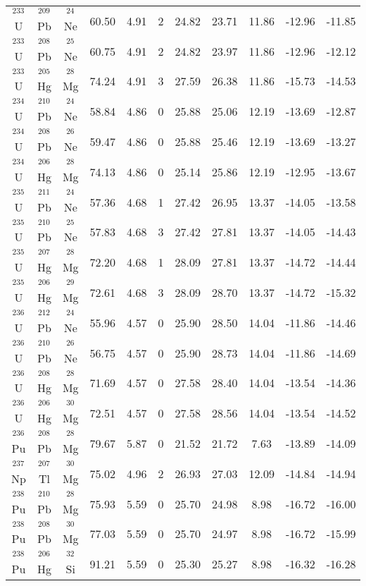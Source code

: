 \documentclass[preprint,10pt]{elsarticle}
\begin{document}
\begin{table*}[!htbp]
{\begin{tabular}{ccccccccccc}
$^{233}$U  & $^{209}$Pb & $^{24}$Ne &60.50  & 4.91& 2&24.82  & 23.71  & 11.86 &  -12.96 & -11.85 \\
$^{233}$U  & $^{208}$Pb & $^{25}$Ne &60.75  & 4.91& 2&24.82  & 23.97  & 11.86 &  -12.96 & -12.12 \\
$^{233}$U  & $^{205}$Hg & $^{28}$Mg &74.24  & 4.91& 3&27.59  & 26.38  & 11.86 &  -15.73 & -14.53 \\
$^{234}$U  & $^{210}$Pb & $^{24}$Ne &58.84  & 4.86& 0&25.88  & 25.06  & 12.19 &  -13.69 & -12.87 \\
$^{234}$U  & $^{208}$Pb & $^{26}$Ne &59.47  & 4.86& 0&25.88  & 25.46  & 12.19 &  -13.69 & -13.27 \\
$^{234}$U  & $^{206}$Hg & $^{28}$Mg &74.13  & 4.86& 0&25.14  & 25.86  & 12.19 &  -12.95 & -13.67 \\
$^{235}$U  & $^{211}$Pb & $^{24}$Ne &57.36  & 4.68& 1&27.42  & 26.95  & 13.37 &  -14.05 & -13.58 \\
$^{235}$U  & $^{210}$Pb & $^{25}$Ne &57.83  & 4.68& 3&27.42  & 27.81  & 13.37 &  -14.05 & -14.43 \\
$^{235}$U  & $^{207}$Hg & $^{28}$Mg &72.20  & 4.68& 1&28.09  & 27.81  & 13.37 &  -14.72 & -14.44 \\
$^{235}$U  & $^{206}$Hg & $^{29}$Mg &72.61  & 4.68& 3&28.09  & 28.70  & 13.37 &  -14.72 & -15.32 \\
$^{236}$U  & $^{212}$Pb & $^{24}$Ne &55.96  & 4.57& 0&25.90  & 28.50  & 14.04 &  -11.86 & -14.46 \\
$^{236}$U  & $^{210}$Pb & $^{26}$Ne &56.75  & 4.57& 0&25.90  & 28.73  & 14.04 &  -11.86 & -14.69 \\
$^{236}$U  & $^{208}$Hg & $^{28}$Mg &71.69  & 4.57& 0&27.58  & 28.40  & 14.04 &  -13.54 & -14.36 \\
$^{236}$U  & $^{206}$Hg & $^{30}$Mg &72.51  & 4.57& 0&27.58  & 28.56  & 14.04 &  -13.54 & -14.52 \\
$^{236}$Pu & $^{208}$Pb & $^{28}$Mg &79.67  & 5.87& 0&21.52  & 21.72  & 7.63  &  -13.89 & -14.09 \\
$^{237}$Np & $^{207}$Tl & $^{30}$Mg &75.02  & 4.96& 2&26.93  & 27.03  & 12.09 &  -14.84 & -14.94 \\
$^{238}$Pu & $^{210}$Pb & $^{28}$Mg &75.93  & 5.59& 0&25.70  & 24.98  & 8.98  &  -16.72 & -16.00 \\
$^{238}$Pu & $^{208}$Pb & $^{30}$Mg &77.03  & 5.59& 0&25.70  & 24.97  & 8.98  &  -16.72 & -15.99 \\
$^{238}$Pu & $^{206}$Hg & $^{32}$Si &91.21  & 5.59& 0&25.30  & 25.27  & 8.98  &  -16.32 & -16.28 \\

\end{tabular}}
\end{table*}
\end{document}
